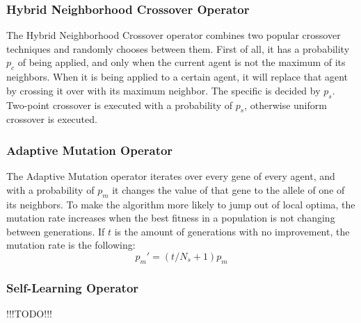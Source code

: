 \subsubsection{Hybrid Neighborhood Crossover Operator}
The Hybrid Neighborhood Crossover operator combines two popular crossover techniques and randomly chooses between them. First of all, it has a probability $p_c$ of being applied, and only when the current agent is not the maximum of its neighbors. When it is being applied to a certain agent, it will replace that agent by crossing it over with its maximum neighbor. The specific is decided by $p_s$. Two-point crossover is executed with a probability of $p_s$, otherwise uniform crossover is executed.
\subsubsection{Adaptive Mutation Operator}
The Adaptive Mutation operator iterates over every gene of every agent, and with a probability of $p_m$ it changes the value of that gene to the allele of one of its neighbors. To make the algorithm more likely to jump out of local optima, the mutation rate increases when the best fitness in a population is not changing between generations. If $t$ is the amount of generations with no improvement, the mutation rate is the following:
\begin{equation}
p_{m}' = ( t / N_s + 1)p_m
\end{equation}
\subsubsection{Self-Learning Operator}
!!!TODO!!!



